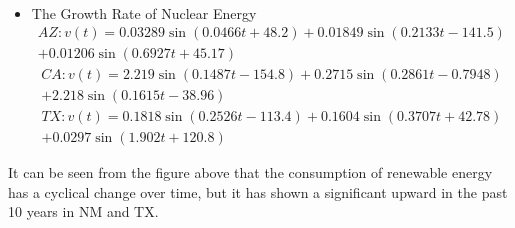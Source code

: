 \documentclass{mcmthesis}
\begin{document}
\begin{itemize}
\begin{multline}
	\end{multline}
	\item The Growth Rate of Nuclear Energy\\
	\begin{multline}
	AZ:v(t)=0.03289\sin(0.0466t+48.2)+0.01849\sin(0.2133t-141.5)\\+0.01206\sin(0.6927t+45.17)%
	\end{multline}
	\begin{multline}
	CA:v(t)=2.219\sin(0.1487t-154.8)+0.2715\sin(0.2861t-0.7948)\\+2.218\sin(0.1615t-38.96)%
	\end{multline}
	\begin{multline}
	TX:v(t)=0.1818\sin(0.2526t-113.4)+0.1604\sin(0.3707t+42.78)\\+0.0297\sin(1.902t+120.8)%
	\end{multline}
\end{itemize}
It can be seen from the figure above that the consumption of renewable energy has a cyclical change over time, but it has shown a significant upward in the past 10 years in NM and TX. 
\end{document}
